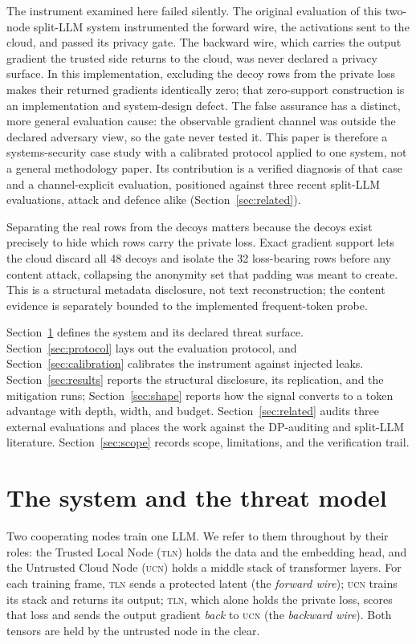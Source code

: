 \documentclass[11pt]{article}
\newcommand{\tln}{\textsc{tln}}
\newcommand{\ucn}{\textsc{ucn}}
\begin{document}
The instrument examined here failed silently. The original evaluation of this
two-node split-LLM system instrumented the forward wire, the activations sent
to the cloud, and passed its privacy gate. The backward wire, which carries the
output gradient the trusted side returns to the cloud, was never declared a privacy
surface. In this implementation, excluding the decoy rows from the private loss
makes their returned gradients identically zero; that zero-support construction
is an implementation and system-design defect. The false assurance has a
distinct, more general evaluation cause: the observable gradient channel was
outside the declared adversary view, so the gate never tested it. This paper is
therefore a systems-security case study with a calibrated protocol applied to
one system, not a general methodology paper. Its contribution is a verified
diagnosis of that case and a channel-explicit evaluation, positioned against
three recent split-LLM evaluations, attack and defence alike
(Section~\ref{sec:related}).

Separating the real rows from the decoys matters because the decoys exist
precisely to hide which rows carry the private loss. Exact gradient support lets the
cloud discard all 48 decoys and isolate the 32 loss-bearing rows before any
content attack, collapsing the anonymity set that padding was meant to create.
This is a structural metadata disclosure, not text reconstruction; the content
evidence is separately bounded to the implemented frequent-token probe.

Section~\ref{sec:system} defines the system and its declared threat surface.
Section~\ref{sec:protocol} lays out the evaluation protocol, and
Section~\ref{sec:calibration} calibrates the instrument against injected leaks.
Section~\ref{sec:results} reports the structural disclosure, its replication,
and the mitigation runs; Section~\ref{sec:shape} reports how the signal
converts to a token advantage with depth, width, and budget.
Section~\ref{sec:related} audits three external evaluations and places the work
against the DP-auditing and split-LLM literature.
Section~\ref{sec:scope} records scope, limitations, and the verification trail.

\section{The system and the threat model}
\label{sec:system}

Two cooperating nodes train one LLM. We refer to them throughout by their
roles: the Trusted Local Node (\tln) holds the data and the
embedding head, and the Untrusted Cloud Node (\ucn) holds a middle stack of
transformer layers. For each training frame, \tln{} sends a protected latent
(the \emph{forward wire}); \ucn{} trains its stack and returns its output;
\tln{}, which alone holds the private loss, scores that loss and sends the
output gradient \emph{back} to \ucn{} (the \emph{backward wire}). Both tensors
are held by the untrusted node in the clear.
\end{document}
